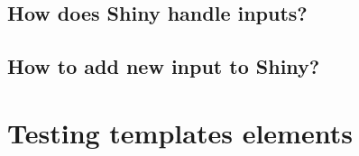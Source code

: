 \documentclass[]{book}
\begin{document}
\hypertarget{how-does-shiny-handle-inputs}{%
\section{How does Shiny handle inputs?}\label{how-does-shiny-handle-inputs}}

\hypertarget{how-to-add-new-input-to-shiny}{%
\section{How to add new input to Shiny?}\label{how-to-add-new-input-to-shiny}}

\hypertarget{custom-templates-testing}{%
\chapter{Testing templates elements}\label{custom-templates-testing}}


\end{document}
